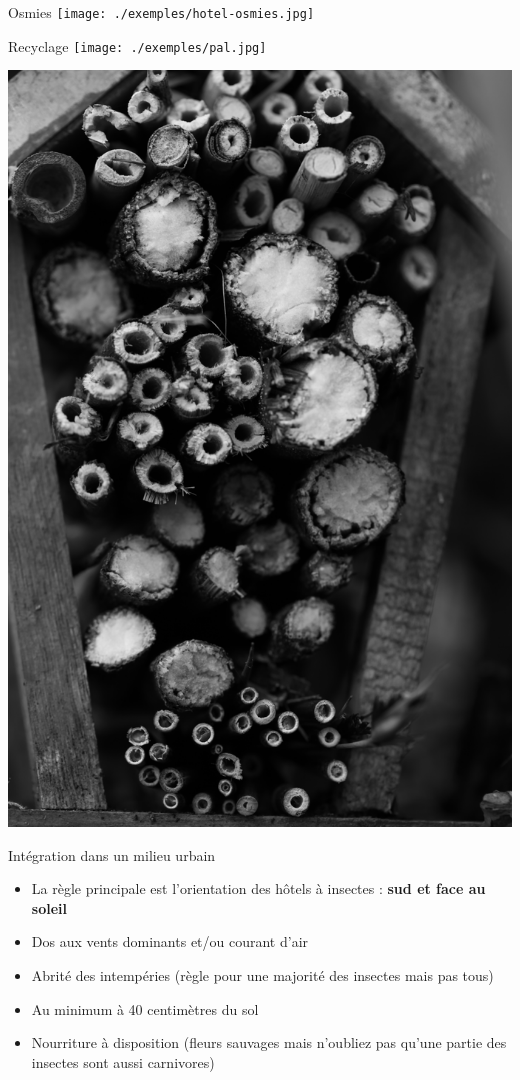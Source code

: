 \documentclass{beamer}
\begin{document}
\begin{frame}{Osmies}
        \texttt{[image: ./exemples/hotel-osmies.jpg]}
\end{frame}
\begin{frame}{Recyclage}
        \texttt{[image: ./exemples/pal.jpg]}
\end{frame}
\begin{frame}
        \includegraphics[scale=0.04]{./exemples/tige-moelle.jpg}
\end{frame}



\begin{frame}{Intégration dans un milieu urbain}
        \begin{itemize}
                \item La règle principale est l'orientation des hôtels à insectes : {\bf sud et face au soleil}
                \item Dos aux vents dominants et/ou courant d'air
                \item Abrité des intempéries (règle pour une majorité des insectes mais pas tous)
                \item Au minimum à 40 centimètres du sol
                \item Nourriture à disposition (fleurs sauvages mais n'oubliez pas qu'une partie des insectes sont aussi carnivores)
        \end{itemize}
\end{frame}
\end{document}
